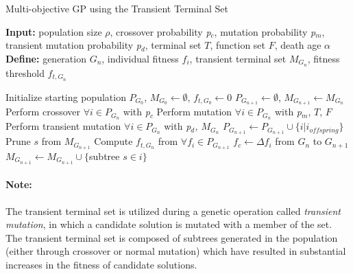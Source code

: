 \documentclass[a4paper]{article}
\begin{document}
\begin{algorithm}
\caption{Multi-objective GP using the Transient Terminal Set}
\hspace*{\algorithmicindent} \textbf{Input:} population size \(\rho\), crossover probability \textit{p$_{c}$}, mutation probability \textit{p$_{m}$}, transient mutation probability \textit{p$_{d}$}, terminal set \(T\), function set \(F\), death age \(\alpha\) \\
\hspace*{\algorithmicindent} \textbf{Define:} generation \(G_{n}\), individual fitness \(f_{i}\), transient terminal set \(M_{G_{n}}\), fitness threshold \(f_{t, G_{n}}\) \\ 
\begin{algorithmic}[1]
\State Initialize starting population \textit{$ P_{G_{0}} $}, \(M_{G_{0}}\leftarrow \emptyset\), \(f_{t, G_{0}} \leftarrow 0\)
 
	\State \(P_{G_{n+1}}\leftarrow \emptyset\), \(M_{G_{n+1}}\leftarrow M_{G_{n}}\)
		
		\State Perform crossover $\forall i\in P_{G_{n}}$ with \textit{p$_{c}$}
		\State Perform mutation $\forall i\in P_{G_{n}}$ with \textit{p$_{m}$}, \(T\), \(F\)
		\State Perform transient mutation $\forall i\in P_{G_{n}}$ with \textit{p$_{d}$, \(M_{G_{n}}\)}
		\State $P_{G_{n+1}} \leftarrow P_{G_{n+1}}\cup \{i | i_{offspring}\}$
	\EndWhile\newline
		
			\State Prune \(s\) from \(M_{G_{n+1}}\)
		\EndIf
	\EndFor
	\State Compute $f_{t, G_{n}}$ from $\forall f_{i} \in P_{G_{n+1}}$
		\State $f_{c}\leftarrow \Delta f_{i}$ from \(G_{n}\) to \(G_{n+1}\)
			\State \(M_{G_{n+1}} \leftarrow M_{G_{n+1}} \cup \{\)subtree \(s\in i \}\)
		\EndIf
	\EndFor 
\EndWhile
\end{algorithmic}\end{algorithm}
\paragraph{Note:} The transient terminal set is utilized during a genetic operation called \textit{transient mutation}, in which a candidate solution is mutated with a member of the set. The transient terminal set is composed of subtrees generated in the population (either through crossover or normal mutation) which have resulted in substantial increases in the fitness of candidate solutions.
\end{document}
